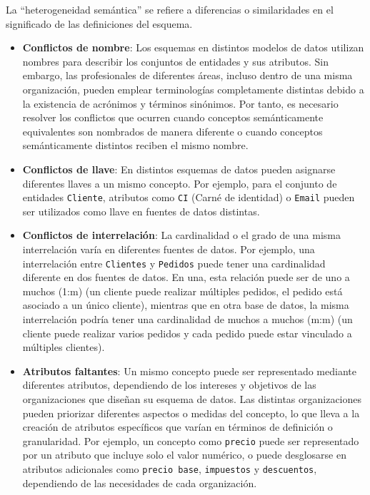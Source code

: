     La ``heterogeneidad semántica'' se refiere a diferencias o similaridades en el significado de las definiciones del esquema.

    \begin{itemize}
        \item \textbf{Conflictos de nombre}: Los esquemas en distintos modelos de datos utilizan nombres para describir los conjuntos
        de entidades y sus atributos. Sin embargo, las profesionales de diferentes áreas, incluso dentro de una misma organización, pueden emplear
        terminologías completamente distintas debido a la existencia de acrónimos y
        términos sinónimos. Por tanto, es necesario resolver
        los conflictos que ocurren cuando conceptos semánticamente equivalentes son nombrados de manera
        diferente o cuando conceptos semánticamente distintos reciben el mismo nombre.
        \item \textbf{Conflictos de llave}: En distintos esquemas de datos pueden asignarse diferentes llaves a un mismo concepto. Por ejemplo, para
        el conjunto de entidades \texttt{Cliente}, atributos como \texttt{CI} (Carné de identidad) o \texttt{Email} pueden ser utilizados como llave
        en fuentes de datos distintas.
        \item \textbf{Conflictos de interrelación}: La cardinalidad o el grado de una misma interrelación varía en diferentes fuentes de datos. 
        Por ejemplo, una interrelación entre \texttt{Clientes} y \texttt{Pedidos} puede tener una cardinalidad diferente en dos fuentes de datos. 
        En una, esta relación puede ser de uno a muchos (1:m) (un cliente puede realizar múltiples pedidos, el pedido está asociado a un único cliente), 
        mientras que en otra base de datos, la misma interrelación podría tener una cardinalidad de 
        muchos a muchos (m:m) (un cliente puede realizar varios pedidos y cada pedido puede estar vinculado a múltiples clientes).
        \item \textbf{Atributos faltantes}: Un mismo concepto puede ser representado mediante diferentes atributos, dependiendo de los intereses y objetivos de las organizaciones que diseñan su esquema de datos. 
        Las distintas organizaciones pueden priorizar diferentes aspectos o medidas del concepto, lo que lleva a la creación de atributos específicos que varían en términos de definición o granularidad. 
        Por ejemplo, un concepto como \texttt{precio} puede ser representado por un atributo que incluye solo el valor numérico, o puede desglosarse en atributos adicionales como \texttt{precio base}, \texttt{impuestos} y \texttt{descuentos},
        dependiendo de las necesidades de cada organización.
    \end{itemize}


